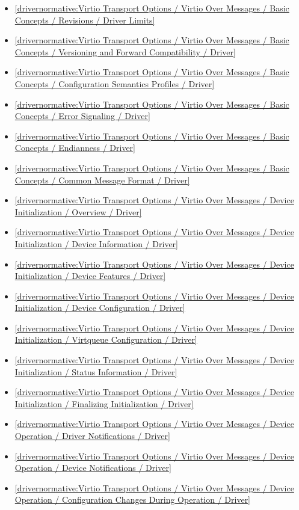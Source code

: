\begin{itemize}
\item \ref{drivernormative:Virtio Transport Options / Virtio Over Messages / Basic Concepts / Revisions / Driver Limits}
\item \ref{drivernormative:Virtio Transport Options / Virtio Over Messages / Basic Concepts / Versioning and Forward Compatibility / Driver}
\item \ref{drivernormative:Virtio Transport Options / Virtio Over Messages / Basic Concepts / Configuration Semantics Profiles / Driver}
\item \ref{drivernormative:Virtio Transport Options / Virtio Over Messages / Basic Concepts / Error Signaling / Driver}
\item \ref{drivernormative:Virtio Transport Options / Virtio Over Messages / Basic Concepts / Endianness / Driver}
\item \ref{drivernormative:Virtio Transport Options / Virtio Over Messages / Basic Concepts / Common Message Format / Driver}
\item \ref{drivernormative:Virtio Transport Options / Virtio Over Messages / Device Initialization / Overview / Driver}
\item \ref{drivernormative:Virtio Transport Options / Virtio Over Messages / Device Initialization / Device Information / Driver}
\item \ref{drivernormative:Virtio Transport Options / Virtio Over Messages / Device Initialization / Device Features / Driver}
\item \ref{drivernormative:Virtio Transport Options / Virtio Over Messages / Device Initialization / Device Configuration / Driver}
\item \ref{drivernormative:Virtio Transport Options / Virtio Over Messages / Device Initialization / Virtqueue Configuration / Driver}
\item \ref{drivernormative:Virtio Transport Options / Virtio Over Messages / Device Initialization / Status Information / Driver}
\item \ref{drivernormative:Virtio Transport Options / Virtio Over Messages / Device Initialization / Finalizing Initialization / Driver}
\item \ref{drivernormative:Virtio Transport Options / Virtio Over Messages / Device Operation / Driver Notifications / Driver}
\item \ref{drivernormative:Virtio Transport Options / Virtio Over Messages / Device Operation / Device Notifications / Driver}
\item \ref{drivernormative:Virtio Transport Options / Virtio Over Messages / Device Operation / Configuration Changes During Operation / Driver}

\end{itemize}

